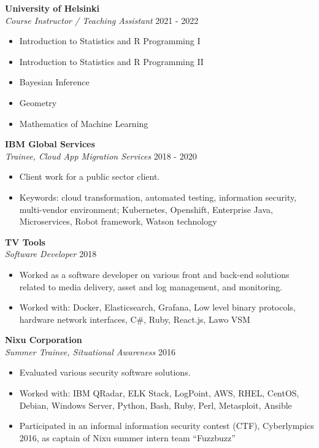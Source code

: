 \documentclass[margin, 10pt]{res} %
\begin{document}
\begin{resume}
\textbf{University of Helsinki}\\
{\sl Course Instructor / Teaching Assistant} \hfill 2021 - 2022  \\
\begin{itemize}
	\item Introduction to Statistics and R Programming I
	\item Introduction to Statistics and R Programming II
	\item Bayesian Inference
	\item Geometry
	\item Mathematics of Machine Learning
\end{itemize}
  
\textbf{IBM Global Services}\\
{\sl Trainee, Cloud App Migration Services} \hfill 2018 - 2020
\begin{itemize} \itemsep -2pt %
\item Client work for a public sector client.
\item Keywords: cloud transformation, automated testing, information security, multi-vendor environment; Kubernetes, Openshift, Enterprise Java, Microservices, Robot framework, Watson technology
\end{itemize}

\addvspace{-7pt}
\textbf{TV Tools}\\
{\sl Software Developer} \hfill 2018
\begin{itemize} \itemsep -2pt %
\item Worked as a software developer on various front and back-end solutions related to media delivery, asset and log management, and monitoring.
\item Worked with: Docker, Elasticsearch, Grafana, Low level binary protocols, hardware network interfaces, C\#, Ruby, React.js, Lawo VSM
\end{itemize}

\addvspace{-7pt}
\textbf{Nixu Corporation}\\
{\sl Summer Trainee, Situational Awareness} \hfill 2016
\begin{itemize} \itemsep -2pt %
\item Evaluated various security software solutions.
\item Worked with:  IBM QRadar, ELK Stack, LogPoint, AWS, RHEL, CentOS, Debian, Windows Server, Python, Bash, Ruby, Perl, Metasploit, Ansible
\item Participated in an informal information security contest (CTF), Cyberlympics 2016, as captain of Nixu summer intern team ``Fuzzbuzz''  
\end{itemize}


\end{resume}
\end{document}
